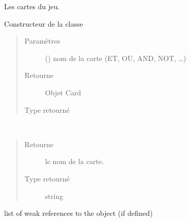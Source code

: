 \documentclass[letterpaper,10pt,french]{sphinxmanual}
\begin{document}
\begin{fulllineitems}
\label{\detokenize{doc_classe:cards.Card}}
Les cartes du jeu.

\begin{fulllineitems}
\label{\detokenize{doc_classe:cards.Card.__init__}}
Constructeur de la classe
\begin{quote}\begin{description}
\item[{Paramètres}] \leavevmode
{} () \textendash{} nom de la carte (ET, OU, AND, NOT, …)

\item[{Retourne}] \leavevmode
Objet Card

\item[{Type retourné}] \leavevmode
{\hyperref[\detokenize{doc_classe:cards.Card}]{}}

\end{description}\end{quote}

\end{fulllineitems}


\begin{fulllineitems}
\label{\detokenize{doc_classe:cards.Card.__repr__}}~\begin{quote}\begin{description}
\item[{Retourne}] \leavevmode
le nom de la carte.

\item[{Type retourné}] \leavevmode
string

\end{description}\end{quote}

\end{fulllineitems}


\begin{fulllineitems}
\label{\detokenize{doc_classe:cards.Card.__weakref__}}
list of weak references to the object (if defined)


\end{fulllineitems}
\end{fulllineitems}
\end{document}
